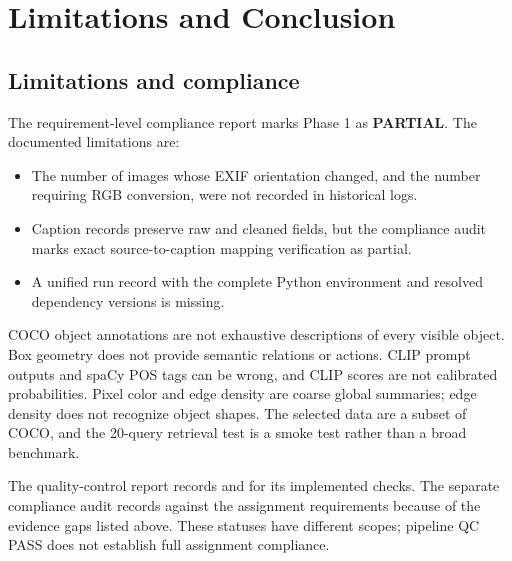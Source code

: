 \section{Limitations and Conclusion}
\label{ch:limitations}

\subsection{Limitations and compliance}
The requirement-level compliance report marks Phase 1 as \textbf{PARTIAL}. The documented limitations are:
\begin{itemize}
  \item The number of images whose EXIF orientation changed, and the number requiring RGB conversion, were not recorded in historical logs.
  \item Caption records preserve raw and cleaned fields, but the compliance audit marks exact source-to-caption mapping verification as partial.
  \item A unified run record with the complete Python environment and resolved dependency versions is missing.
\end{itemize}

COCO object annotations are not exhaustive descriptions of every visible object. Box geometry does not provide semantic relations or actions. CLIP prompt outputs and spaCy POS tags can be wrong, and CLIP scores are not calibrated probabilities. Pixel color and edge density are coarse global summaries; edge density does not recognize object shapes. The selected data are a subset of COCO, and the 20-query retrieval test is a smoke test rather than a broad benchmark.

The quality-control report records  and  for its implemented checks. The separate compliance audit records  against the assignment requirements because of the evidence gaps listed above. These statuses have different scopes; pipeline QC PASS does not establish full assignment compliance.
